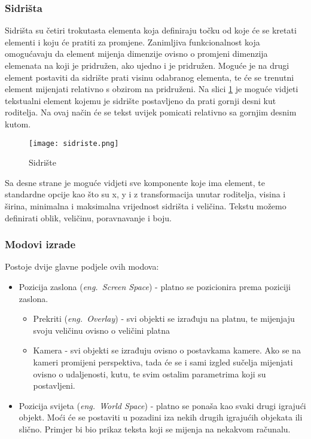 \subsubsection{Sidrišta}
Sidrišta su četiri trokutasta elementa koja definiraju točku od koje će se kretati elementi i koju će pratiti za promjene. Zanimljiva funkcionalnost koja omogućavaju da element mijenja dimenzije ovisno o promjeni dimenzija elemenata na koji je pridružen, ako ujedno i je pridružen. Moguće je na drugi element postaviti da sidrište prati visinu odabranog elementa, te će se trenutni element mijenjati relativno s obzirom na pridruženi. Na slici \ref{fig:sidriste} je moguće vidjeti tekstualni element kojemu je sidrište postavljeno da prati gornji desni kut roditelja. Na ovaj način će se tekst uvijek pomicati relativno sa gornjim desnim kutom.
\begin{figure}[h]
	\texttt{[image: sidriste.png]}
	\centering
	\caption{Sidrište}
	\label{fig:sidriste}
\end{figure}
\newline
Sa desne strane je moguće vidjeti sve komponente koje ima element, te standardne opcije kao što su x, y i z transformacija unutar roditelja, visina i širina, minimalna i maksimalna vrijednost sidrišta i veličina. Tekstu možemo definirati oblik, veličinu, poravnavanje i boju.
\newpage

\subsubsection{Modovi izrade}
Postoje dvije glavne podjele ovih modova:
\begin{itemize} 
	\item Pozicija zaslona (\emph{eng.~Screen Space}) - platno se pozicionira prema poziciji zaslona. 
		\begin{itemize}
			\item Prekriti (\emph{eng.~Overlay}) - svi objekti se izrađuju na platnu, te mijenjaju svoju veličinu ovisno o veličini platna
			\item Kamera - svi objekti se izrađuju ovisno o postavkama kamere. Ako se na kameri promijeni perspektiva, tada će se i sami izgled sučelja mijenjati ovisno o udaljenosti, kutu, te svim ostalim parametrima koji su postavljeni.
		\end{itemize}
	\item Pozicija svijeta (\emph{eng.~World Space}) - platno se ponaša kao svaki drugi igrajući objekt. Moći će se postaviti u pozadini iza nekih drugih igrajućih objekata ili slično. Primjer bi bio prikaz teksta koji se mijenja na nekakvom računalu.
\end{itemize}

